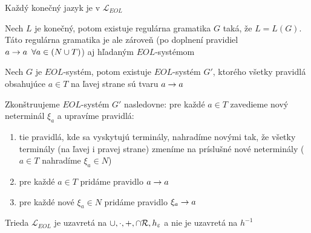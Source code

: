 \begin{veta}
    Každý konečný jazyk je v $\mathcal{L}_{EOL}$
\end{veta}

\begin{dokaz}
    Nech $L$ je konečný, potom existuje regulárna gramatika $G$ taká,
    že $L=L(G)$. Táto regulárna gramatika je ale zároveň (po doplnení
    pravidiel $a\rightarrow a\enspace\forall a\in(N\cup T)$) aj hľa\-da\-ným
    $EOL$-systémom
\end{dokaz}

\begin{lema}
    \label{norm_tvarEOL} Nech $G$ je $EOL$-systém, potom existuje
    $EOL$-systém $G'$, ktorého všetky pravidlá obsahujúce $a\in T$ na
    ľavej strane sú tvaru $a\rightarrow a$
\end{lema}

\begin{dokaz}
    Zkonštruujeme $EOL$-systém $G'$ nasledovne: pre každé $a\in T$
    zavedieme nový neterminál $\xi_{a}$ a upravíme pravidlá:
    \begin{enumerate}
    \item tie pravidlá, kde sa vyskytujú terminály, nahradíme novými tak,
    že všetky terminály (na ľavej i pravej strane) zmeníme na
    príslušné nové neterminály ($a\in T$ nahradíme $\xi_{a}\in N$)
    \item pre každé $a\in T$ pridáme pravidlo $a\rightarrow a$
    \item pre každé nové $\xi_{a}\in N$ pridáme pravidlo $\xi_{a}\rightarrow a$
    \end{enumerate}
\end{dokaz}

\begin{veta}
    Trieda $\mathcal{L}_{EOL}$ je uzavretá na
    $\cup,\cdot,+,\cap\mathcal{R},h_{\varepsilon}$ a nie je uzavretá
    na $h^{-1}$
\end{veta}

